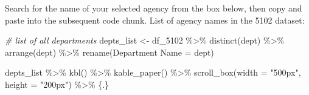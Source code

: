 \documentclass[
]{article}
\newenvironment{Shaded}{\begin{snugshade}}{\end{snugshade}}
\newcommand{\AttributeTok}[1]{\textcolor[rgb]{0.77,0.63,0.00}{#1}}
\newcommand{\CommentTok}[1]{\textcolor[rgb]{0.56,0.35,0.01}{\textit{#1}}}
\newcommand{\FunctionTok}[1]{\textcolor[rgb]{0.00,0.00,0.00}{#1}}
\newcommand{\NormalTok}[1]{#1}
\newcommand{\OtherTok}[1]{\textcolor[rgb]{0.56,0.35,0.01}{#1}}
\newcommand{\SpecialCharTok}[1]{\textcolor[rgb]{0.00,0.00,0.00}{#1}}
\newcommand{\StringTok}[1]{\textcolor[rgb]{0.31,0.60,0.02}{#1}}
\begin{document}
Search for the name of your selected agency from the box below, then
copy and paste into the subsequent code chunk. List of agency names in
the 5102 dataset:

\begin{Shaded}
\begin{Highlighting}[]
\CommentTok{\# list of all departments}
\NormalTok{depts\_list }\OtherTok{\textless{}{-}}\NormalTok{ df\_5102 }\SpecialCharTok{\%\textgreater{}\%} 
    \FunctionTok{distinct}\NormalTok{(dept) }\SpecialCharTok{\%\textgreater{}\%} 
    \FunctionTok{arrange}\NormalTok{(dept) }\SpecialCharTok{\%\textgreater{}\%} 
    \FunctionTok{rename}\NormalTok{(}\StringTok{\textquotesingle{}Department Name\textquotesingle{}} \OtherTok{=}\NormalTok{ dept)}


\NormalTok{depts\_list }\SpecialCharTok{\%\textgreater{}\%} 
    \FunctionTok{kbl}\NormalTok{() }\SpecialCharTok{\%\textgreater{}\%} 
    \FunctionTok{kable\_paper}\NormalTok{() }\SpecialCharTok{\%\textgreater{}\%}
    \FunctionTok{scroll\_box}\NormalTok{(}\AttributeTok{width =} \StringTok{"500px"}\NormalTok{, }\AttributeTok{height =} \StringTok{"200px"}\NormalTok{) }\SpecialCharTok{\%\textgreater{}\%}
\NormalTok{    \{.\}}
\end{Highlighting}
\end{Shaded}
\end{document}
